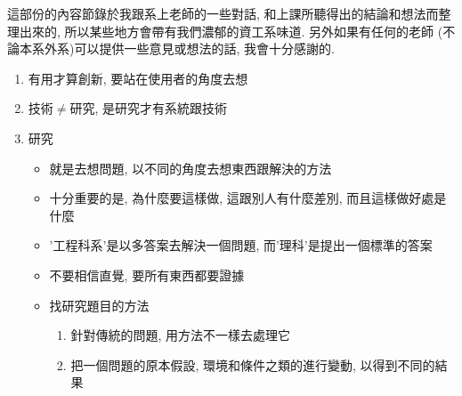 

這部份的內容節錄於我跟系上老師的一些對話, 和上課所聽得出的結論和想法而整理出來的, 所以某些地方會帶有我們濃郁的資工系味道. 另外如果有任何的老師 (不論本系外系)可以提供一些意見或想法的話, 我會十分感謝的.


\begin{enumerate}
  \item
  {
    有用才算創新, 要站在使用者的角度去想
  } %

  \item
  {
    技術$\neq$研究, 是研究才有系統跟技術
  } %

  \item
  {
    研究
    \begin{itemize}
      \item
      {
        就是去想問題, 以不同的角度去想東西跟解決的方法
      } %

      \item
      {
        十分重要的是, 為什麼要這樣做, 這跟別人有什麼差別, 而且這樣做好處是什麼
      } %

      \item
      {
        '工程科系'是以多答案去解決一個問題, 而'理科'是提出一個標準的答案
      } %

      \item
      {
        不要相信直覺, 要所有東西都要證據
      } %

      \item
      {
        找研究題目的方法
      } %

      \begin{enumerate}
        \item
        {
          針對傳統的問題, 用方法不一樣去處理它
        } %

        \item
        {
          把一個問題的原本假設, 環境和條件之類的進行變動, 以得到不同的結果
        } %
      \end{enumerate}
    \end{itemize}
  } %


\end{enumerate}
